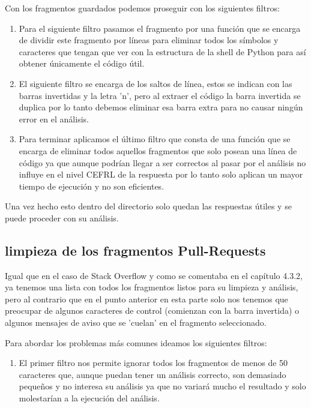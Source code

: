 \documentclass[a4paper, 12pt]{book}
\begin{document}
Con los fragmentos guardados podemos proseguir con los siguientes filtros:

\begin{enumerate}
	\item Para el siguiente filtro pasamos el fragmento por una función que se encarga de dividir este fragmento por líneas para eliminar todos los símbolos y caracteres que tengan que ver con la estructura de la shell de Python para así obtener únicamente el código útil.
	\item El siguiente filtro se encarga de los saltos de línea, estos se indican con las barras invertidas y la letra 'n', pero al extraer el código la barra invertida se duplica por lo tanto debemos eliminar esa barra extra para no causar ningún error en el análisis.
	\item Para terminar aplicamos el último filtro que consta de una función que se encarga de eliminar todos aquellos fragmentos que solo posean una línea de código ya que aunque podrían llegar a ser correctos al pasar por el análisis no influye en el nivel CEFRL de la respuesta por lo tanto solo aplican un mayor tiempo de ejecución y no son eficientes.
\end{enumerate}

Una vez hecho esto dentro del directorio solo quedan las respuestas útiles y se puede proceder con su análisis.

\subsection{limpieza de los fragmentos Pull-Requests}

Igual que en el caso de Stack Overflow y como se comentaba en el capítulo 4.3.2, ya tenemos una lista con todos los fragmentos listos para su limpieza y análisis, pero al contrario que en el punto anterior en esta parte solo nos tenemos que preocupar de algunos caracteres de control (comienzan con la barra invertida) o algunos mensajes de aviso que se 'cuelan' en el fragmento seleccionado.

Para abordar los problemas más comunes ideamos los siguientes filtros:

\begin{enumerate}
	\item El primer filtro nos permite ignorar todos los fragmentos de menos de 50 caracteres que, aunque puedan tener un análisis correcto, son demasiado pequeños y no interesa su análisis ya que no variará mucho el resultado y solo molestarían a la ejecución del análisis.
\end{enumerate}
\end{document}
